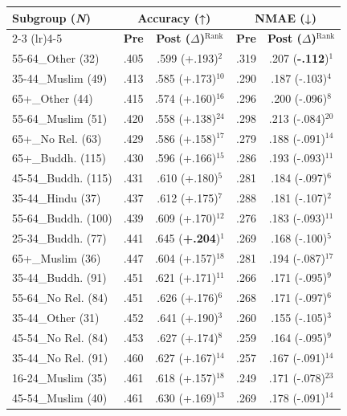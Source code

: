 \begin{tabular}{@{} p{2.65cm} | c c | c c @{}}
\toprule
\multirow{2}{*}{\textbf{Subgroup (\textbf{\textit{N}})}} & \multicolumn{2}{c|}{\textbf{Accuracy (↑)}} & \multicolumn{2}{c}{\textbf{NMAE (↓)}} \\
\cmidrule(lr){2-3} \cmidrule(lr){4-5}
& \textbf{Pre} & \textbf{Post ($\Delta$)}$^{\text{Rank}}$ & \textbf{Pre} & \textbf{Post ($\Delta$)}$^{\text{Rank}}$ \\
\midrule
55-64\_Other (32) & .405 & .599 (+.193)$^{2}$ & .319 & .207 (\textbf{-.112})$^{1}$ \\
35-44\_Muslim (49) & .413 & .585 (+.173)$^{10}$ & .290 & .187 (-.103)$^{4}$ \\
65+\_Other (44) & .415 & .574 (+.160)$^{16}$ & .296 & .200 (-.096)$^{8}$ \\
55-64\_Muslim (51) & .420 & .558 (+.138)$^{24}$ & .298 & .213 (-.084)$^{20}$ \\
65+\_No Rel. (63) & .429 & .586 (+.158)$^{17}$ & .279 & .188 (-.091)$^{14}$ \\
65+\_Buddh. (115) & .430 & .596 (+.166)$^{15}$ & .286 & .193 (-.093)$^{11}$ \\
45-54\_Buddh. (115) & .431 & .610 (+.180)$^{5}$ & .281 & .184 (-.097)$^{6}$ \\
35-44\_Hindu (37) & .437 & .612 (+.175)$^{7}$ & .288 & .181 (-.107)$^{2}$ \\
55-64\_Buddh. (100) & .439 & .609 (+.170)$^{12}$ & .276 & .183 (-.093)$^{11}$ \\
25-34\_Buddh. (77) & .441 & .645 (\textbf{+.204})$^{1}$ & .269 & .168 (-.100)$^{5}$ \\
65+\_Muslim (36) & .447 & .604 (+.157)$^{18}$ & .281 & .194 (-.087)$^{17}$ \\
35-44\_Buddh. (91) & .451 & .621 (+.171)$^{11}$ & .266 & .171 (-.095)$^{9}$ \\
55-64\_No Rel. (84) & .451 & .626 (+.176)$^{6}$ & .268 & .171 (-.097)$^{6}$ \\
35-44\_Other (31) & .452 & .641 (+.190)$^{3}$ & .260 & .155 (-.105)$^{3}$ \\
45-54\_No Rel. (84) & .453 & .627 (+.174)$^{8}$ & .259 & .164 (-.095)$^{9}$ \\
35-44\_No Rel. (91) & .460 & .627 (+.167)$^{14}$ & .257 & .167 (-.091)$^{14}$ \\
16-24\_Muslim (35) & .461 & .618 (+.157)$^{18}$ & .249 & .171 (-.078)$^{23}$ \\
45-54\_Muslim (40) & .461 & .630 (+.169)$^{13}$ & .269 & .178 (-.091)$^{14}$ \\

\end{tabular}
